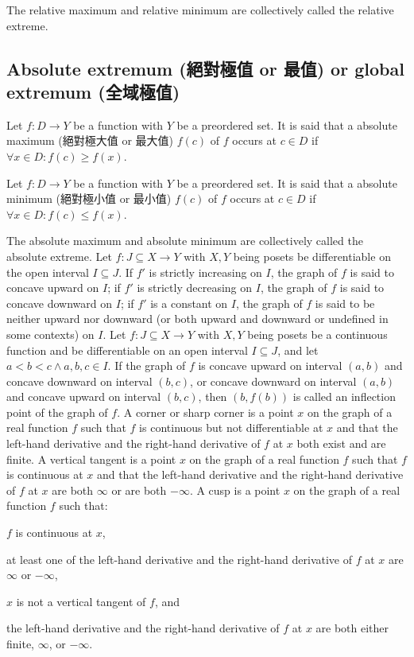 \documentclass[a4paper,12pt]{report}
\begin{document}
The relative maximum and relative minimum are collectively called the relative extreme.
\subsection{Absolute extremum (絕對極值 or 最值) or global extremum (全域極值)}
Let $f\colon D\to Y$ be a function with $Y$ be a preordered set. It is said that a absolute maximum (絕對極大值 or 最大值) \( f(c) \) of \(f\) occurs at $c\in D$ if \( \forall x\in D\colon f(c) \geq f(x) \).

Let $f\colon D\to Y$ be a function with $Y$ be a preordered set. It is said that a absolute minimum (絕對極小值 or 最小值) \( f(c) \) of \(f\) occurs at $c\in D$ if \( \forall x\in D\colon f(c) \leq f(x) \).

The absolute maximum and absolute minimum are collectively called the absolute extreme.
Let $f\colon J\subseteq X\to Y$ with $X,Y$ being posets be differentiable on the open interval $I\subseteq J$. If $f'$ is strictly increasing on $I$, the graph of $f$ is said to concave upward on $I$; if $f'$ is strictly decreasing on $I$, the graph of $f$ is said to concave downward on $I$; if $f'$ is a constant on $I$, the graph of $f$ is said to be neither upward nor downward (or both upward and downward or undefined in some contexts) on $I$.
Let $f\colon J\subseteq X\to Y$ with $X,Y$ being posets be a continuous function and be differentiable on an open interval $I\subseteq J$, and let $a<b<c\land a,b,c\in I$. If the graph of $f$ is concave upward on interval $(a,b)$ and concave downward on interval $(b,c)$, or concave downward on interval $(a,b)$ and concave upward on interval $(b,c)$, then $(b,f(b))$ is called an inflection point of the graph of $f$.
A corner or sharp corner is a point $x$ on the graph of a real function $f$ such that $f$ is continuous but not differentiable at $x$ and that the left-hand derivative and the right-hand derivative of $f$ at $x$ both exist and are finite.
A vertical tangent is a point $x$ on the graph of a real function $f$ such that $f$ is continuous at $x$ and that the left-hand derivative and the right-hand derivative of $f$ at $x$ are both $\infty$ or are both $-\infty$.
A cusp is a point $x$ on the graph of a real function $f$ such that:
\bit
\item $f$ is continuous at $x$,
\item at least one of the left-hand derivative and the right-hand derivative of $f$ at $x$ are $\infty$ or $-\infty$,
\item $x$ is not a vertical tangent of $f$, and
\item the left-hand derivative and the right-hand derivative of $f$ at $x$ are both either finite, $\infty$, or $-\infty$.
\eit
\end{document}
